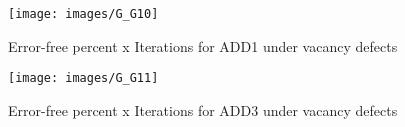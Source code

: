 \begin{figure}[h!]
\center
\texttt{[image: images/G\_G10]}
\caption{Error-free percent x Iterations for ADD1 under vacancy defects}
\label{figure:full_reg_gt5}
\end{figure}

\begin{figure}[h!]
\center
\texttt{[image: images/G\_G11]}
\caption{Error-free percent x Iterations for ADD3 under vacancy defects}
\label{figure:full_mod_gt5}
\end{figure}
\pagebreak
